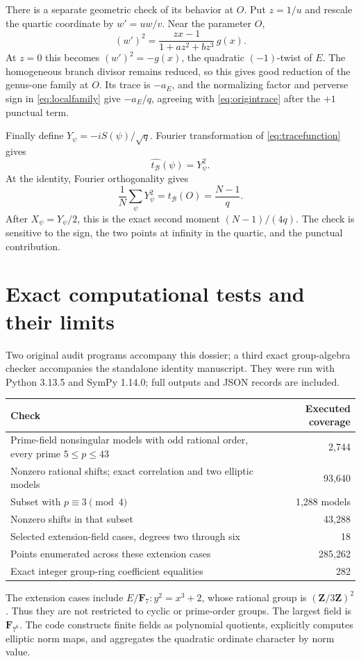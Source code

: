 \documentclass[11pt,a4paper]{article}
\numberwithin{equation}{section}
\newcommand{\F}{\mathbf F}
\newcommand{\B}{\mathcal B}
\begin{document}
There is a separate geometric check of its behavior at $O$. Put $z=1/u$ and rescale the quartic coordinate by $w'=uw/v$. Near the parameter $O$,
\begin{equation}\label{eq:limit}
 (w')^2=\frac{z x-1}{1+az^2+bz^3}\,g(x).
\end{equation}
At $z=0$ this becomes $(w')^2=-g(x)$, the quadratic $(-1)$-twist of $E$. The homogeneous branch divisor remains reduced, so this gives good reduction of the genus-one family at $O$. Its trace is $-a_E$, and the normalizing factor and perverse sign in \eqref{eq:localfamily} give $-a_E/q$, agreeing with \eqref{eq:origintrace} after the $+1$ punctual term.

Finally define $Y_\psi=-iS(\psi)/\sqrt q$. Fourier transformation of \eqref{eq:tracefunction} gives
\begin{equation}\label{eq:square}
 \boxed{\widehat{t_{\B}}(\psi)=Y_\psi^2.}
\end{equation}
At the identity, Fourier orthogonality gives
\begin{equation}
 \frac1N\sum_\psi Y_\psi^2=t_{\B}(O)=\frac{N-1}{q}.
\end{equation}
After $X_\psi=Y_\psi/2$, this is the exact second moment $(N-1)/(4q)$. The check is sensitive to the sign, the two points at infinity in the quartic, and the punctual contribution.

\section{Exact computational tests and their limits}
Two original audit programs accompany this dossier; a third exact group-algebra checker accompanies the standalone identity manuscript. They were run with Python 3.13.5 and SymPy 1.14.0; full outputs and JSON records are included.

\begin{center}
\begin{tabular}{p{.58\linewidth}r}
\toprule
Check & Executed coverage\\
\midrule
Prime-field nonsingular models with odd rational order, every prime $5\le p\le43$ & 2,744\\
Nonzero rational shifts; exact correlation and two elliptic models & 93,640\\
Subset with $p\equiv3\pmod4$ & 1,288 models\\
Nonzero shifts in that subset & 43,288\\
Selected extension-field cases, degrees two through six & 18\\
Points enumerated across these extension cases & 285,262\\
Exact integer group-ring coefficient equalities & 282\\
\bottomrule
\end{tabular}
\end{center}
The extension cases include $E/\F_7:y^2=x^3+2$, whose rational group is $(\mathbf Z/3\mathbf Z)^2$. Thus they are not restricted to cyclic or prime-order groups. The largest field is $\F_{7^6}$. The code constructs finite fields as polynomial quotients, explicitly computes elliptic norm maps, and aggregates the quadratic ordinate character by norm value.
\end{document}
